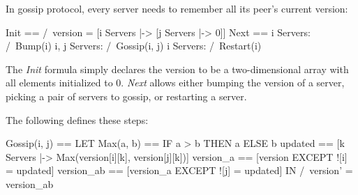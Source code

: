In gossip protocol, every server needs to remember all its peer's current
version:\\

\begin{tla}
Init ==
    /\ version = [i \in Servers |-> [j \in Servers |-> 0]]
Next ==
    \/ \E i \in Servers:
        /\ Bump(i)
    \/ \E i, j \in Servers:
        /\ Gossip(i, j)
    \/ \E i \in Servers:
        /\ Restart(i)
\end{tla}
\begin{tlatex}
%
%
%
%
%
%
%
%
\end{tlatex}
\newline

The \textit{Init} formula simply declares the version to be a two-dimensional array
with all elements initialized to 0. \textit{Next} allows either bumping the version
of a server, picking a pair of servers to gossip, or restarting a server.\newline

The following defines these steps:\newline

\begin{tla}
Gossip(i, j) == 
    LET 
        Max(a, b) == IF a > b THEN a ELSE b
        updated == [k \in Servers |-> Max(version[i][k], version[j][k])]
        version_a == [version EXCEPT ![i] = updated]
        version_ab == [version_a EXCEPT ![j] = updated]
    IN 
        /\ version' = version_ab 
\end{tla}
\begin{tlatex}
%
%
%
%
\end{tlatex}
\newline


